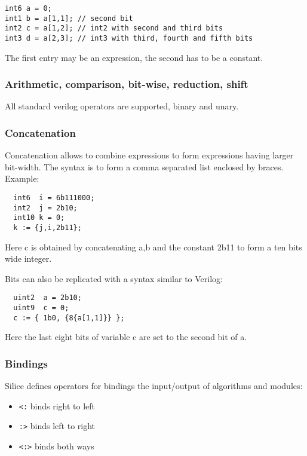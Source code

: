 \documentclass[a4]{article}
\newcommand\todo[1]{{\color{magenta}\textbf{TODO:} #1}}
\newcommand\silice{Silice}
\begin{document}
\begin{verbatim}
int6 a = 0;
int1 b = a[1,1]; // second bit
int2 c = a[1,2]; // int2 with second and third bits
int3 d = a[2,3]; // int3 with third, fourth and fifth bits
\end{verbatim}

The first entry may be an expression, the second has to be a constant.

\subsubsection{Arithmetic, comparison, bit-wise, reduction, shift}

All standard verilog operators are supported, binary and unary.

\subsubsection{Concatenation}

Concatenation allows to combine expressions to form expressions having larger bit-width.
The syntax is to form a comma separated list enclosed by braces.  Example:
\begin{verbatim}
  int6  i = 6b111000;
  int2  j = 2b10;
  int10 k = 0;
  k := {j,i,2b11};
\end{verbatim}

Here c is obtained by concatenating a,b and the constant 2b11 to form a ten bits wide integer.

Bits can also be replicated with a syntax similar to Verilog:

\begin{verbatim}
  uint2  a = 2b10;
  uint9  c = 0;
  c := { 1b0, {8{a[1,1]}} };
\end{verbatim}

Here the last eight bits of variable c are set to the second bit of a.

\subsubsection{Bindings}
\label{sec:bindings}

\silice{} defines operators for bindings the input/output of algorithms and modules:
\begin{itemize}
	\item \texttt{<:} binds right to left
	\item \texttt{:>} binds left to right
	\item \texttt{<:>} binds both ways %
\end{itemize}
\end{document}
